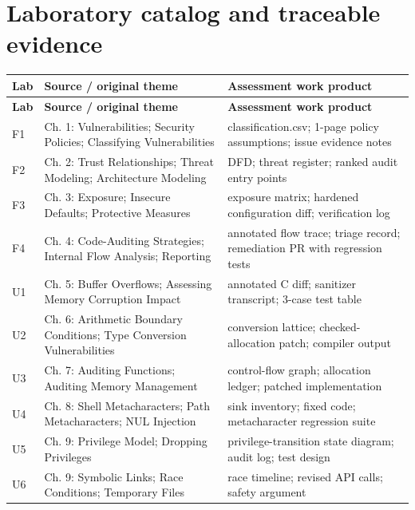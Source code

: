 \documentclass[10pt,letterpaper]{article}
\begin{document}
\section{Laboratory catalog and traceable evidence}
\begingroup\footnotesize\setlength\tabcolsep{3pt}
\begin{longtable}{>{\raggedright\arraybackslash}p{}>{\raggedright\arraybackslash}p{}>{\raggedright\arraybackslash}p{}}\toprule
\textbf{Lab} & \textbf{Source / original theme} & \textbf{Assessment work product}\\\midrule\endfirsthead
\toprule \textbf{Lab} & \textbf{Source / original theme} & \textbf{Assessment work product}\\\midrule\endhead
F1 & Ch. 1: Vulnerabilities; Security Policies; Classifying Vulnerabilities & classification.csv; 1-page policy assumptions; issue evidence notes\\\midrule
F2 & Ch. 2: Trust Relationships; Threat Modeling; Architecture Modeling & DFD; threat register; ranked audit entry points\\\midrule
F3 & Ch. 3: Exposure; Insecure Defaults; Protective Measures & exposure matrix; hardened configuration diff; verification log\\\midrule
F4 & Ch. 4: Code-Auditing Strategies; Internal Flow Analysis; Reporting & annotated flow trace; triage record; remediation PR with regression tests\\\midrule
U1 & Ch. 5: Buffer Overflows; Assessing Memory Corruption Impact & annotated C diff; sanitizer transcript; 3-case test table\\\midrule
U2 & Ch. 6: Arithmetic Boundary Conditions; Type Conversion Vulnerabilities & conversion lattice; checked-allocation patch; compiler output\\\midrule
U3 & Ch. 7: Auditing Functions; Auditing Memory Management & control-flow graph; allocation ledger; patched implementation\\\midrule
U4 & Ch. 8: Shell Metacharacters; Path Metacharacters; NUL Injection & sink inventory; fixed code; metacharacter regression suite\\\midrule
U5 & Ch. 9: Privilege Model; Dropping Privileges & privilege-transition state diagram; audit log; test design\\\midrule
U6 & Ch. 9: Symbolic Links; Race Conditions; Temporary Files & race timeline; revised API calls; safety argument\\\midrule

\end{longtable}
\end{document}
